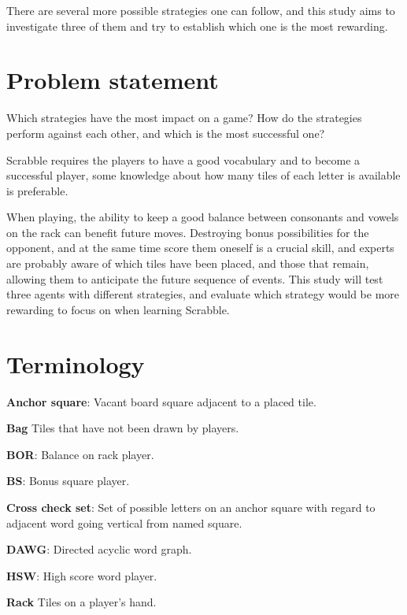 \documentclass[a4paper, 12pt]{report}
\begin{document}
There are several more possible strategies one can follow, and this study aims to investigate three of them and try to establish which one is the most rewarding.

\section{Problem statement}
Which strategies have the most impact on a game? How do the strategies perform against each other, and which is the most successful one?

Scrabble requires the players to have a good vocabulary and to become a successful player, some knowledge about how many tiles of each letter is available is preferable. 

When playing, the ability to keep a good balance between consonants and vowels on the rack can benefit future moves. Destroying bonus possibilities for the opponent, and at the same time score them oneself is a crucial skill, and experts are probably aware of which tiles have been placed, and those that remain, allowing them to anticipate the future sequence of events. This study will test three agents with different strategies, and evaluate which strategy would be more rewarding to focus on when learning Scrabble.


\section {Terminology}
\label{sec:terminology}

\begin{description}
\item{\bf{Anchor square}}: Vacant board square adjacent to a placed tile.

\item{\bf{Bag}} Tiles that have not been drawn by players.

\item{\bf{BOR}}: Balance on rack player.

\item{\bf{BS}}: Bonus square player.

\item{\bf{Cross check set}}: Set of possible letters on an anchor square with regard to adjacent word going vertical from named square.

\item{\bf{DAWG}}: Directed acyclic word graph.

\item{\bf{HSW}}: High score word player.

\item{\bf{Rack}} Tiles on a player's hand. 

\end{description}
\end{document}
